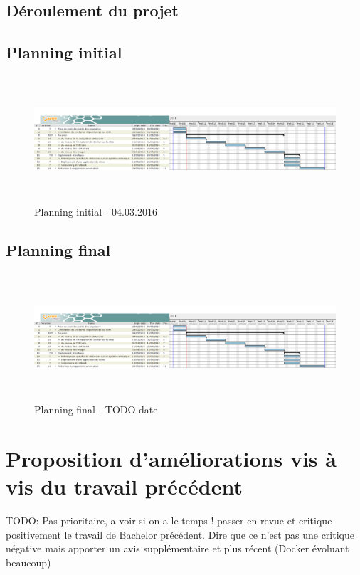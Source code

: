 \documentclass[11pt,a4paper,oneside]{report}
\begin{document}
\begin{landscape}
\chapter{Déroulement du projet}


\section{Planning initial}
\begin{figure}[ht]
\centering
\includegraphics[height=4.7cm]{img/initial_planning.png}
\caption{Planning initial - 04.03.2016}
\end{figure}


\section{Planning final}
\begin{figure}[ht]
\centering
\includegraphics[draft,height=4.7cm]{img/initial_planning.png}
\caption{Planning final - TODO date}
\end{figure}

\end{landscape}
\chapter{Proposition d'améliorations vis à vis du travail précédent}
TODO: Pas prioritaire, a voir si on a le temps ! passer en revue et critique positivement le travail de Bachelor précédent. Dire que ce n'est pas une critique négative mais apporter un avis supplémentaire et plus récent (Docker évoluant beaucoup)
\end{document}
